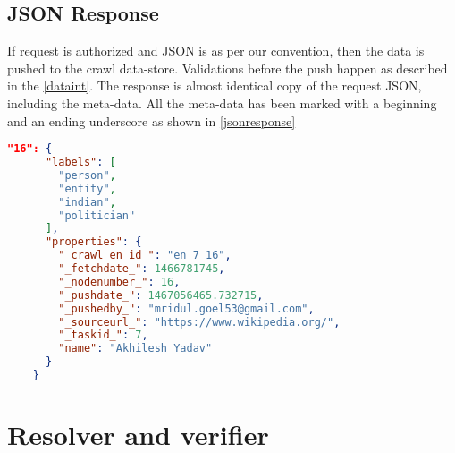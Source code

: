 \subsection{JSON Response}
If request is authorized and JSON is as per our convention, then the data is pushed to the crawl data-store. Validations before the push happen as described in the \ref{dataint}. The response is almost identical copy of the request JSON, including the meta-data. All the meta-data has been marked with a beginning and an ending underscore as shown in \ref{jsonresponse} \\


\label{jsonresponse}
\begin{lstlisting}[language=json,firstnumber=1]
"16": {
      "labels": [
        "person",
        "entity",
        "indian",
        "politician"
      ],
      "properties": {
        "_crawl_en_id_": "en_7_16",
        "_fetchdate_": 1466781745,
        "_nodenumber_": 16,
        "_pushdate_": 1467056465.732715,
        "_pushedby_": "mridul.goel53@gmail.com",
        "_sourceurl_": "https://www.wikipedia.org/",
        "_taskid_": 7,
        "name": "Akhilesh Yadav"
      }
    }
\end{lstlisting}



\section{Resolver and verifier}


